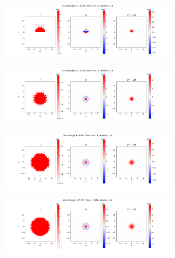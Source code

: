 \documentclass{article}
\begin{document}
\begin{figure}[H]
  \begin{subfigure}[b]{\textwidth}
    \includegraphics[width=\textwidth]{imgs/lf_output2/slice0/mat10.png}
  \end{subfigure}
  \hfill
  \begin{subfigure}[b]{\textwidth}
    \includegraphics[width=\textwidth]{imgs/lf_output2/slice25/mat10.png}
  \end{subfigure}
  \hfill
  \begin{subfigure}[b]{\textwidth}
    \includegraphics[width=\textwidth]{imgs/lf_output2/slice50/mat10.png}
  \end{subfigure}
  \hfill
  \begin{subfigure}[b]{\textwidth}
    \includegraphics[width=\textwidth]{imgs/lf_output2/slice75/mat10.png}
  \end{subfigure}
\end{figure}
\end{document}
